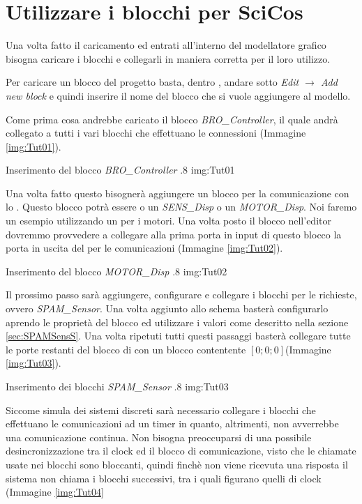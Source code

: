 \section{Utilizzare i blocchi per SciCos}
Una volta fatto il caricamento ed entrati all'interno del modellatore
grafico bisogna caricare i blocchi e collegarli in maniera corretta per il
loro utilizzo.

Per caricare un blocco del progetto basta, dentro \SciCos{}, andare sotto
\emph{Edit $\rightarrow{}$ Add new block} e quindi inserire il nome del
blocco che si vuole aggiungere al modello.

Come prima cosa andrebbe caricato il blocco \emph{BRO\_Controller}, il
quale andrà collegato a tutti i vari blocchi che effettuano le connessioni
(Immagine \ref{img:Tut01}).

        {Inserimento del blocco \emph{BRO\_Controller}}
        {.8}
        {img:Tut01}

Una volta fatto questo bisognerà aggiungere un blocco per la comunicazione
con lo \SPAM{}. Questo blocco potrà essere o un \emph{SENS\_Disp} o un
\emph{MOTOR\_Disp}. Noi faremo un esempio utilizzando un
 per i motori. Una volta posto il blocco
nell'editor dovremmo provvedere a collegare alla prima porta in input di
questo blocco la porta in uscita del  per le
comunicazioni (Immagine \ref{img:Tut02}).

        {Inserimento del blocco \emph{MOTOR\_Disp}}
        {.8}
        {img:Tut02}

Il prossimo passo sarà aggiungere, configurare e collegare i blocchi
per le richieste, ovvero \emph{SPAM\_Sensor}. Una volta aggiunto allo
schema basterà configurarlo aprendo le proprietà del blocco ed utilizzare i
valori come descritto nella sezione \ref{sec:SPAMSensS}. Una volta ripetuti
tutti questi passaggi basterà collegare tutte le porte restanti del blocco
di  con un blocco contentente $[0;0;0]$(Immagine
\ref{img:Tut03}).

        {Inserimento dei blocchi \emph{SPAM\_Sensor}}
        {.8}
        {img:Tut03}

Siccome \SciCos{} simula dei sistemi discreti sarà necessario collegare i
blocchi che effettuano le comunicazioni ad un timer in quanto, altrimenti,
non avverrebbe una comunicazione continua. Non bisogna preoccuparsi di una
possibile desincronizzazione tra il clock ed il blocco di comunicazione,
visto che le chiamate usate nei blocchi sono bloccanti, quindi finchè non
viene ricevuta una risposta il sistema non chiama i blocchi successivi, tra
i quali figurano quelli di clock (Immagine \ref{img:Tut04}

